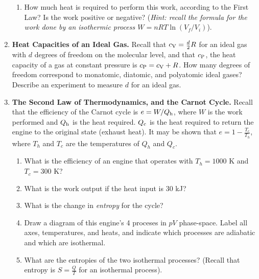 \documentclass[10pt]{article}
\begin{document}
\begin{enumerate}
\begin{enumerate}
\item How much heat is required to perform this work, according to the First Law? Is the work positive or negative?  (\textit{Hint: recall the formula for the work done by an isothermic process $W = nRT\ln(V_f/V_i)$}). \\ \vspace{2cm}
\end{enumerate}
\item \textbf{Heat Capacities of an Ideal Gas.} Recall that $c_{\rm V} = \frac{d}{2}R$ for an ideal gas with $d$ degrees of freedom on the molecular level, and that $c_{\rm P}$, the heat capacity of a gas at constant pressure is $c_{\rm P} = c_{\rm V} + R$.  How many degrees of freedom correspond to monatomic, diatomic, and polyatomic ideal gases?  Describe an experiment to measure $d$ for an ideal gas. \\ \vspace{3cm}
\item \textbf{The Second Law of Thermodynamics, and the Carnot Cycle.}  Recall that the efficiency of the Carnot cycle is $e = W/Q_{\rm h}$, where $W$ is the work performed and $Q_{\rm h}$ is the heat required.  $Q_{\rm c}$ is the heat required to return the engine to the original state (exhaust heat).  It may be shown that $e = 1 - \frac{T_c}{T_h}$, where $T_h$ and $T_c$ are the temperatures of $Q_h$ and $Q_c$.
\begin{enumerate}
\item What is the efficiency of an engine that operates with $T_h = 1000$ K and $T_c = 300$ K? \\ \vspace{2cm}
\item What is the work output if the heat input is 30 kJ? \\ \vspace{2cm}
\item What is the change in \textit{entropy} for the cycle? \\ \vspace{2cm}
\item Draw a diagram of this engine's 4 proceses in $pV$ phase-space.  Label all axes, temperatures, and heats, and indicate which processes are adiabatic and which are isothermal. \\ \vspace{4cm}
\item What are the entropies of the two isothermal processes? (Recall that entropy is $S = \frac{Q}{T}$ for an isothermal process).
\end{enumerate}
\end{enumerate}
\end{document}
